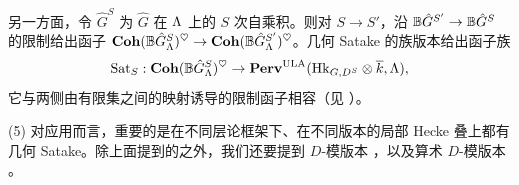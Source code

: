 \begin{rmk}
另一方面，令 $\hat{G}^S$ 为 $\hat{G}$ 在 ${\Lambda}$ 上的 $S$ 次自乘积。则对 $S\to S'$，沿 ${\mathbb B} \hat{G}^{S'}\to {\mathbb B} \hat{G}^S$ 的限制给出函子 ${\mathbf{Coh}}({\mathbb B} \hat{G}_{{\Lambda}}^S)^\heartsuit\to {\mathbf{Coh}}({\mathbb B} \hat{G}_{{\Lambda}}^{S'})^\heartsuit$。几何 Satake 的族版本给出函子族
\begin{equation}\label{factorizable Sat}
{\operatorname{Sat}}_S: {\mathbf{Coh}}( {\mathbb B} \hat{G}_{{\Lambda}}^S)^\heartsuit\to {\mathbf{Perv}}^{\operatorname{ULA}}({\operatorname{Hk}}_{G,D^S}\otimes\overline k,{\Lambda}),
\end{equation}
它与两侧由有限集之间的映射诱导的限制函子相容（见 \cite{Gaitsgory-deJong, Zhu-PCMI}）。

(5) 对应用而言，重要的是在不同层论框架下、在不同版本的局部 Hecke 叠上都有几何 Satake。除上面提到的之外，我们还要提到 $D$-模版本 \cite{Beilinson-Drinfeld-Hitchin}，以及算术 $D$-模版本 \cite{Xu-Zhu-Bessel}。
\end{rmk}
